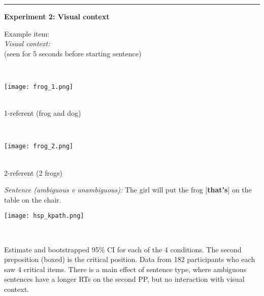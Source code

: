 \documentclass[11pt,a4paper]{article}
\begin{document}
\smallskip
\rule{\textwidth}{1pt}
\begin{center}\textbf{Experiment 2: Visual context}\end{center}

	\begin{minipage}{.3\textwidth}
	\begin{small}Example item:\\\textit{Visual context:} \\ (seen for 5 seconds before starting sentence) \end{small}
\end{minipage}	~~~
\begin{minipage}{.3\textwidth}
\texttt{[image: frog\_1.png]}		\begin{small}\\
	1-referent (frog and dog) \end{small}

\end{minipage}
~~~
\begin{minipage}{.3\textwidth}	
\texttt{[image: frog\_2.png]}
\begin{small}\\ 2-referent (2 frogs) \end{small}

\end{minipage}

\begin{minipage}{\textwidth}
	\begin{small}
	\textit{Sentence (ambiguous v unambiguous):} The girl will put the frog [\textbf{that's}] on the table on the chair.
	\end{small}
	
\end{minipage}

\vspace{10pt}
	\begin{minipage}{.65\textwidth}
		{	\texttt{[image: hsp\_kpath.png]}} 
	
	\end{minipage}
	~~~
	\begin{minipage}{.3\textwidth}		\begin{small}

			Estimate and bootstrapped 95\% CI for each of the 4 conditions. The second preposition (boxed) is the critical position. Data from 182 participants who each saw 4 critical items. There is a main effect of sentence type, where ambiguous sentences have a longer RTs on the second PP, but no interaction with visual context. 
			
		\end{small}
		\end{minipage}
		
\end{document}
